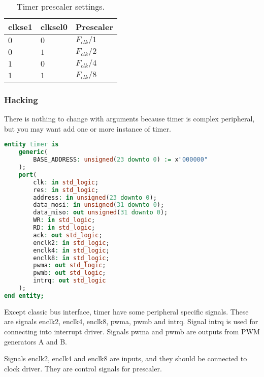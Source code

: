 \begin{table}[h]
    \centering
    \begin{tabular}{|l|l|l|}
        \hline
        \textbf{clkse1} & \textbf{clksel0} & \textbf{Prescaler} \\ \hline
        $0$ & $0$ & $F_{clk}/1$ \\ \hline
        $0$ & $1$ & $F_{clk}/2$ \\ \hline
        $1$ & $0$ & $F_{clk}/4$ \\ \hline
        $1$ & $1$ & $F_{clk}/8$ \\ \hline
    \end{tabular}
    \caption{Timer prescaler settings.}
    \label{tab:tim_prescaler_setting}
\end{table}

\subsubsection{Hacking}

There is nothing to change with arguments because timer is complex peripheral,
but you may want add one or more instance of timer.

\begin{lstlisting}[language=VHDL, frame=single]
entity timer is
    generic(
        BASE_ADDRESS: unsigned(23 downto 0) := x"000000"
    );
    port(
        clk: in std_logic;
        res: in std_logic;
        address: in unsigned(23 downto 0);
        data_mosi: in unsigned(31 downto 0);
        data_miso: out unsigned(31 downto 0);
        WR: in std_logic;
        RD: in std_logic;
        ack: out std_logic;
        enclk2: in std_logic;
        enclk4: in std_logic;
        enclk8: in std_logic;
        pwma: out std_logic;
        pwmb: out std_logic;
        intrq: out std_logic
    );
end entity;
\end{lstlisting}

Except classic bus interface, timer have some peripheral specific signals.
These are signals enclk2, enclk4, enclk8, pwma, pwmb and intrq. Signal intrq
is used for connecting into interrupt driver. Signals pwma and pwmb are outputs
from PWM generators A and B.

Signals enclk2, enclk4 and enclk8 are inputs, and they should be connected to
clock driver. They are control signals for prescaler.
